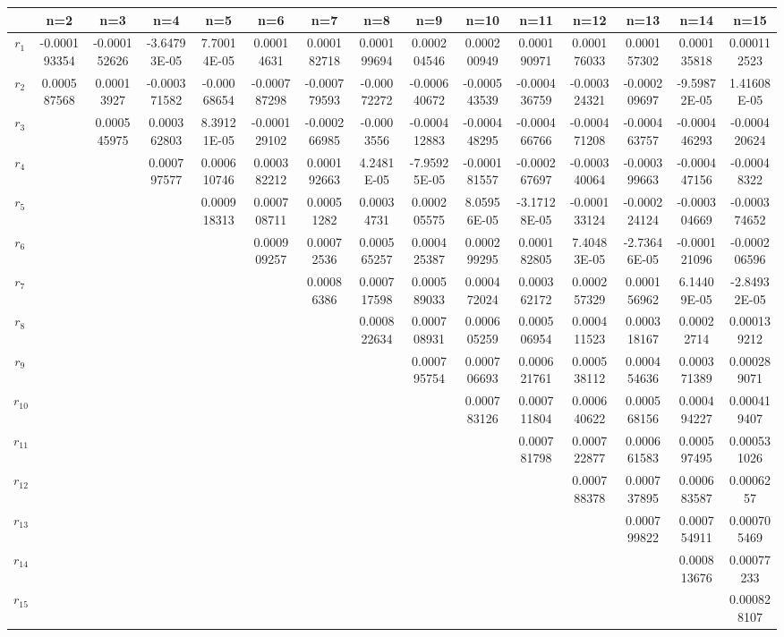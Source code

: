 \documentclass[a4paper]{article}
\begin{document}
\begin{CJK*}{GBK}{song}
\begin{center}
\begin{table*}[!htbp]
{\begin{threeparttable}[!htbp]
\begin{tabular}{ccccc ccccc ccccc}
 &n=2&n=3 &n=4 &n=5 &n=6 &n=7 &n=8 &n=9 &n=10 &n=11 &n=12 &n=13 &n=14 &n=15 \\ \hline
$r_{1}$	&	-0.000193354	&	-0.000152626	&	-3.64793E-05	&	7.70014E-05	&	0.00014631	&	0.000182718	&	0.000199694	&	0.000204546	&	0.000200949	&	0.000190971	&	0.000176033	&	0.000157302	&	0.000135818	&	0.000112523	\\
$r_{2}$	&	0.000587568	&	0.00013927	&	-0.000371582	&	-0.00068654	&	-0.000787298	&	-0.000779593	&	-0.00072272	&	-0.000640672	&	-0.000543539	&	-0.000436759	&	-0.000324321	&	-0.000209697	&	-9.59872E-05	&	1.41608E-05	\\
$r_{3}$	&		&	0.000545975	&	0.000362803	&	8.39121E-05	&	-0.000129102	&	-0.000266985	&	-0.0003556	&	-0.000412883	&	-0.000448295	&	-0.000466766	&	-0.000471208	&	-0.000463757	&	-0.000446293	&	-0.000420624	\\
$r_{4}$	&		&		&	0.000797577	&	0.000610746	&	0.000382212	&	0.000192663	&	4.2481E-05	&	-7.95925E-05	&	-0.000181557	&	-0.000267697	&	-0.000340064	&	-0.000399663	&	-0.000447156	&	-0.00048322	\\
$r_{5}$	&		&		&		&	0.000918313	&	0.000708711	&	0.00051282	&	0.00034731	&	0.000205575	&	8.05956E-05	&	-3.17128E-05	&	-0.000133124	&	-0.000224124	&	-0.000304669	&	-0.000374652	\\
$r_{6}$	&		&		&		&		&	0.000909257	&	0.00072536	&	0.000565257	&	0.000425387	&	0.000299295	&	0.000182805	&	7.40483E-05	&	-2.73646E-05	&	-0.000121096	&	-0.000206596	\\
$r_{7}$	&		&		&		&		&		&	0.00086386	&	0.000717598	&	0.000589033	&	0.000472024	&	0.000362172	&	0.000257329	&	0.000156962	&	6.14409E-05	&	-2.84932E-05	\\
$r_{8}$	&		&		&		&		&		&		&	0.000822634	&	0.000708931	&	0.000605259	&	0.000506954	&	0.000411523	&	0.000318167	&	0.00022714	&	0.000139212	\\
$r_{9}$	&		&		&		&		&		&		&		&	0.000795754	&	0.000706693	&	0.000621761	&	0.000538112	&	0.000454636	&	0.000371389	&	0.000289071	\\
$r_{10}$	&		&		&		&		&		&		&		&		&	0.000783126	&	0.000711804	&	0.000640622	&	0.000568156	&	0.000494227	&	0.000419407	\\
$r_{11}$	&		&		&		&		&		&		&		&		&		&	0.000781798	&	0.000722877	&	0.000661583	&	0.000597495	&	0.000531026	\\
$r_{12}$	&		&		&		&		&		&		&		&		&		&		&	0.000788378	&	0.000737895	&	0.000683587	&	0.0006257	\\
$r_{13}$	&		&		&		&		&		&		&		&		&		&		&		&	0.000799822	&	0.000754911	&	0.000705469	\\
$r_{14}$	&		&		&		&		&		&		&		&		&		&		&		&		&	0.000813676	&	0.00077233	\\
$r_{15}$	&		&		&		&		&		&		&		&		&		&		&		&		&		&	0.000828107	\\


\end{tabular}
\end{threeparttable}}
\end{table*}
\end{center}
\end{CJK*}
\end{document}
